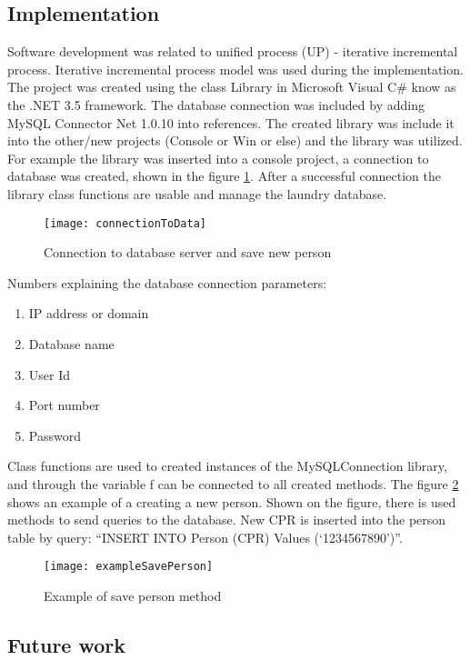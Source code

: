 \subsection{Implementation}

Software development was related to unified process (UP) - iterative incremental process.  Iterative incremental process model \cite{bib5} was used during the implementation.  
The project was created using the class Library in Microsoft Visual C\# know as the .NET 3.5 framework. The database connection was included by adding MySQL Connector Net 1.0.10 into references. The created library was include it into the other/new projects (Console or Win or else) and the library was utilized. For example the library was  inserted into a console project, a connection to database was created, shown in the figure \ref{fig:connectionToData}. After a successful connection the library class functions are usable and manage the laundry database. 

\begin{figure}[h]
	\centering
		\texttt{[image: connectionToData]}
	\caption{Connection to database server and save new person}
	\label{fig:connectionToData}
\end{figure}

Numbers explaining the database connection parameters:

\begin{enumerate}
	\item IP address or domain
	\item Database name
	\item User Id
	\item Port number
	\item Password
\end{enumerate}

Class functions are used to created instances of the MySQLConnection library, and through the variable f can be connected to all created methods. The figure \ref{fig:exampleSavePerson} shows an example of a creating a new person. Shown on the figure, there is used methods to send queries to the database. New CPR is inserted into the person table by query: “INSERT INTO Person (CPR) Values (‘1234567890’)”.

\begin{figure}[h]
	\centering
		\texttt{[image: exampleSavePerson]}
	\caption{Example of save person method}
	\label{fig:exampleSavePerson}
\end{figure}

\subsection{Future work}